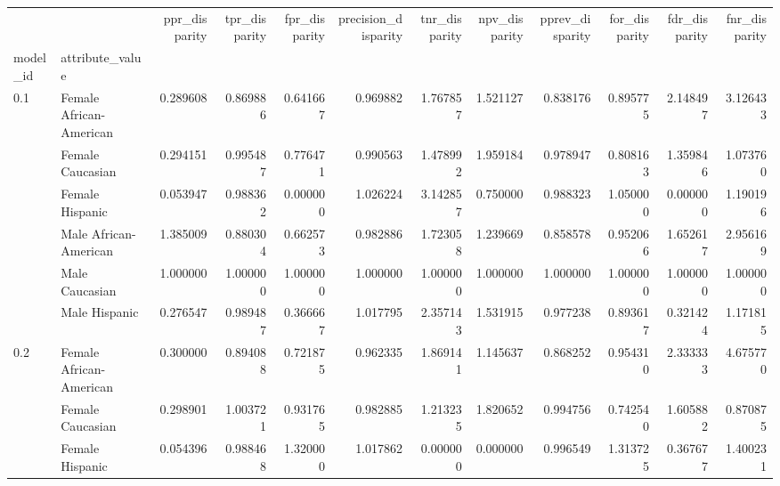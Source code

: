 \begin{tabular}{llrrrrrrrrrr}
\toprule
    &               &  ppr\_disparity &  tpr\_disparity &  fpr\_disparity &  precision\_disparity &  tnr\_disparity &  npv\_disparity &  pprev\_disparity &  for\_disparity &  fdr\_disparity &  fnr\_disparity \\
model\_id & attribute\_value &                &                &                &                      &                &                &                  &                &                &                \\
\midrule
0.1 & Female African-American &       0.289608 &       0.869886 &       0.641667 &             0.969882 &       1.767857 &       1.521127 &         0.838176 &       0.895775 &       2.148497 &       3.126433 \\
    & Female Caucasian &       0.294151 &       0.995487 &       0.776471 &             0.990563 &       1.478992 &       1.959184 &         0.978947 &       0.808163 &       1.359846 &       1.073760 \\
    & Female Hispanic &       0.053947 &       0.988362 &       0.000000 &             1.026224 &       3.142857 &       0.750000 &         0.988323 &       1.050000 &       0.000000 &       1.190196 \\
    & Male African-American &       1.385009 &       0.880304 &       0.662573 &             0.982886 &       1.723058 &       1.239669 &         0.858578 &       0.952066 &       1.652617 &       2.956169 \\
    & Male Caucasian &       1.000000 &       1.000000 &       1.000000 &             1.000000 &       1.000000 &       1.000000 &         1.000000 &       1.000000 &       1.000000 &       1.000000 \\
    & Male Hispanic &       0.276547 &       0.989487 &       0.366667 &             1.017795 &       2.357143 &       1.531915 &         0.977238 &       0.893617 &       0.321424 &       1.171815 \\
0.2 & Female African-American &       0.300000 &       0.894088 &       0.721875 &             0.962335 &       1.869141 &       1.145637 &         0.868252 &       0.954310 &       2.333333 &       4.675770 \\
    & Female Caucasian &       0.298901 &       1.003721 &       0.931765 &             0.982885 &       1.213235 &       1.820652 &         0.994756 &       0.742540 &       1.605882 &       0.870875 \\
    & Female Hispanic &       0.054396 &       0.988468 &       1.320000 &             1.017862 &       0.000000 &       0.000000 &         0.996549 &       1.313725 &       0.367677 &       1.400231 \\

\end{tabular}
